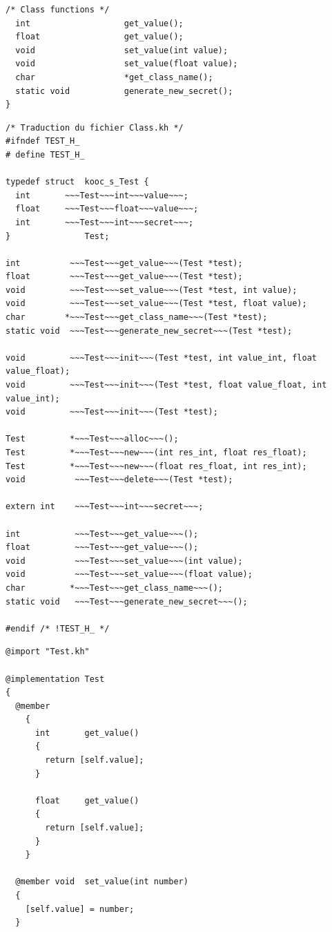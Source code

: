 \documentclass[12pt,a4paper]{article}
\begin{document}
\begin{NoHyper}
\begin{lstlisting}[title={Class.kh}]
  /* Class functions */
  int                   get_value();
  float                 get_value();
  void                  set_value(int value);
  void                  set_value(float value);
  char                  *get_class_name();
  static void           generate_new_secret();
}
\end{lstlisting}
\begin{lstlisting}[title={Class.h}]
/* Traduction du fichier Class.kh */
#ifndef TEST_H_
# define TEST_H_

typedef struct  kooc_s_Test {
  int       ~~~Test~~~int~~~value~~~;
  float     ~~~Test~~~float~~~value~~~;
  int       ~~~Test~~~int~~~secret~~~;
}               Test;

int          ~~~Test~~~get_value~~~(Test *test);
float        ~~~Test~~~get_value~~~(Test *test);
void         ~~~Test~~~set_value~~~(Test *test, int value);
void         ~~~Test~~~set_value~~~(Test *test, float value);
char        *~~~Test~~~get_class_name~~~(Test *test);
static void  ~~~Test~~~generate_new_secret~~~(Test *test);

void         ~~~Test~~~init~~~(Test *test, int value_int, float value_float);
void         ~~~Test~~~init~~~(Test *test, float value_float, int value_int);
void         ~~~Test~~~init~~~(Test *test);

Test         *~~~Test~~~alloc~~~();
Test         *~~~Test~~~new~~~(int res_int, float res_float);
Test         *~~~Test~~~new~~~(float res_float, int res_int);
void          ~~~Test~~~delete~~~(Test *test);

extern int    ~~~Test~~~int~~~secret~~~;

int           ~~~Test~~~get_value~~~();
float         ~~~Test~~~get_value~~~();
void          ~~~Test~~~set_value~~~(int value);
void          ~~~Test~~~set_value~~~(float value);
char         *~~~Test~~~get_class_name~~~();
static void   ~~~Test~~~generate_new_secret~~~();

#endif /* !TEST_H_ */

\end{lstlisting}
\begin{lstlisting}[title={Class.kc}]
@import "Test.kh"

@implementation Test
{
  @member
    {
      int       get_value()
      {
        return [self.value];
      }

      float     get_value()
      {
        return [self.value];
      }
    }

  @member void  set_value(int number)
  {
    [self.value] = number;
  }


\end{lstlisting}
\end{NoHyper}
\end{document}
